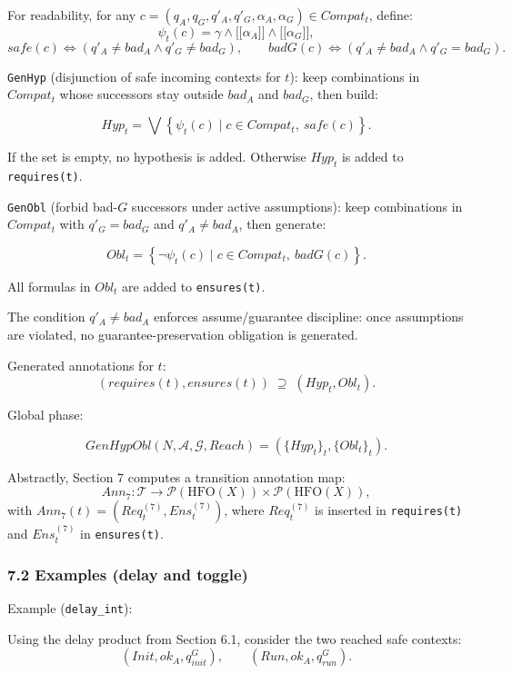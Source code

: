 \documentclass[
]{article}
\providecommand{\llbracket}{\mathopen{[\![}}
\providecommand{\rrbracket}{\mathclose{]\!]}}
\begin{document}
For readability, for any
\(c=(q_A,q_G,q'_A,q'_G,\alpha_A,\alpha_G)\in Compat_t\), define: \[
\psi_t(c)=\gamma\land\llbracket\alpha_A\rrbracket\land\llbracket\alpha_G\rrbracket,
\] \[
safe(c)\iff (q'_A\neq bad_A \land q'_G\neq bad_G),\qquad
badG(c)\iff (q'_A\neq bad_A \land q'_G=bad_G).
\]

\texttt{GenHyp} (disjunction of safe incoming contexts for \(t\)): keep
combinations in \(Compat_t\) whose successors stay outside \(bad_A\) and
\(bad_G\), then build:

\[
Hyp_t=
\bigvee
\left\{
\psi_t(c)
\mid
c\in Compat_t,\ safe(c)
\right\}.
\]

If the set is empty, no hypothesis is added. Otherwise \(Hyp_t\) is
added to \texttt{requires(t)}.

\texttt{GenObl} (forbid bad-\(G\) successors under active assumptions):
keep combinations in \(Compat_t\) with \(q'_G=bad_G\) and
\(q'_A\neq bad_A\), then generate:

\[
Obl_t=
\left\{
\neg\psi_t(c)
\mid
c\in Compat_t,\ badG(c)
\right\}.
\]

All formulas in \(Obl_t\) are added to \texttt{ensures(t)}.

The condition \(q'_A\neq bad_A\) enforces assume/guarantee discipline:
once assumptions are violated, no guarantee-preservation obligation is
generated.

Generated annotations for \(t\): \[
(requires(t),ensures(t))\;\supseteq\;(Hyp_t,Obl_t).
\]

Global phase:

\[
GenHypObl(N,\mathcal A,\mathcal G,Reach)=
\left(\{Hyp_t\}_t,\{Obl_t\}_t\right).
\]

Abstractly, Section 7 computes a transition annotation map: \[
Ann_7:\mathcal T\to \mathcal P(\mathrm{HFO}(X))\times \mathcal P(\mathrm{HFO}(X)),
\] with \(Ann_7(t)=(Req_t^{(7)},Ens_t^{(7)})\), where \(Req_t^{(7)}\) is
inserted in \texttt{requires(t)} and \(Ens_t^{(7)}\) in
\texttt{ensures(t)}.

\subsubsection{7.2 Examples (delay and
toggle)}\label{examples-delay-and-toggle}

Example (\texttt{delay\_int}):

Using the delay product from Section 6.1, consider the two reached safe
contexts: \[
(Init,ok_A,q^G_{init}),\qquad (Run,ok_A,q^G_{run}).
\]
\end{document}
